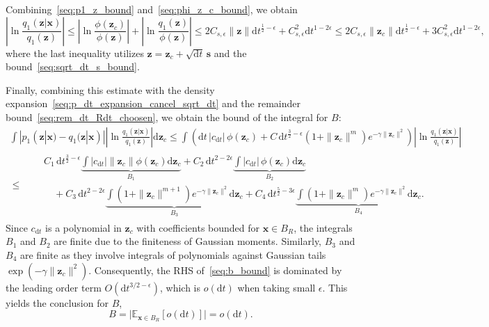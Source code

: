 Combining~\eqref{seq:p1_z_bound} and~\eqref{seq:phi_z_c_bound}, we obtain
\begin{equation}
    \left|\ln\frac{q_1(\bm z|\bm x)}{q_1(\bm z)}\right|
    \leq
    \left|\ln\frac{\phi(\bm z_c)}{\phi(\bm z)}\right|
    +\left|\ln\frac{q_1(\bm z)}{\phi(\bm z)}\right|
    \leq
    2C_{s,\epsilon}\|\bm z\|\mathrm dt^{\frac{1}{2}-\epsilon}
    +C_{s,\epsilon}^2\mathrm dt^{1-2\epsilon}
    \leq2C_{s,\epsilon}\|\bm z_c\|\mathrm dt^{\frac{1}{2}-\epsilon}
    +3C_{s,\epsilon}^2\mathrm dt^{1-2\epsilon},
    \label{seq:ln_q1x_q1_bound}
\end{equation}
where the last inequality utilizes $\bm z = \bm z_c + \sqrt{\mathrm dt}\,\bm s$ and the bound~\eqref{seq:sqrt_dt_s_bound}. 

Finally, combining this estimate with the density expansion~\eqref{seq:p_dt_expansion_cancel_sqrt_dt} and the remainder bound~\eqref{seq:rem_dt_Rdt_choosen}, we obtain the bound of the integral for $B$:
\begin{equation}
    \begin{aligned}
    \int|p_1(\bm z|\bm x)-q_1(\bm z|\bm x)|
    \left|\ln\frac{q_1(\bm z|\bm x)}{q_1(\bm z)}\right|
    \mathrm d\bm z_c
    \leq
    \int\left(\mathrm dt\,|c_{\mathrm dt}|\,\phi(\bm z_c)
    +C\,\mathrm dt^{\frac{3}{2}-\epsilon}(1+\|\bm z_c\|^m)e^{-\gamma\|\bm z_c\|^2}\right)
    \left|\ln\frac{q_1(\bm z|\bm x)}{q_1(\bm z)}\right|
    \\
    \leq
    \begin{aligned}
        &\quad C_1\,\mathrm dt^{\frac{3}{2}-\epsilon}
        \underbrace{
        \int |c_{\mathrm dt}|\|\bm z_c\|\phi(\bm z_c)\mathrm d\bm z_c}_{B_1}
        +
        C_2\,\mathrm dt^{2-2\epsilon}
        \underbrace{
        \int |c_{\mathrm dt}|\,\phi(\bm z_c)\mathrm d\bm z_c}_{B_2}
        \\
        &\qquad 
        +C_3\,\mathrm dt^{2-2\epsilon}\underbrace{
        \int(1+\|\bm z_c\|^{m+1})e^{-\gamma\|\bm z_c\|^2}\mathrm d\bm z_c}_{B_3}
        +C_4\,\mathrm dt^{\frac{5}{2}-3\epsilon}
        \underbrace{\int(1+\|\bm z_c\|^m)e^{-\gamma\|\bm z_c\|^2}\mathrm d\bm z_c}_{B_4}.
    \end{aligned}
    \end{aligned}
    \label{seq:b_bound}
\end{equation}
Since $c_{\mathrm dt}$ is a polynomial in $\bm z_c$ with coefficients bounded for $\bm x\in B_R$, the integrals $B_1$ and $B_2$ are finite due to the finiteness of Gaussian moments. Similarly, $B_3$ and $B_4$ are finite as they involve integrals of polynomials against Gaussian tails $\exp(-\gamma\|\bm z_c\|^2)$. Consequently, the RHS of~\eqref{seq:b_bound} is dominated by the leading order term $O(\mathrm dt^{3/2-\epsilon})$, which is $o(\mathrm dt)$ when taking small $\epsilon$. This yields the conclusion for $B$,
\begin{equation}
    B=\big|\mathbb E_{\bm x\in B_R}[o(\mathrm dt)]\big|=o(\mathrm dt).
    \label{seq:B_odt}
\end{equation}

